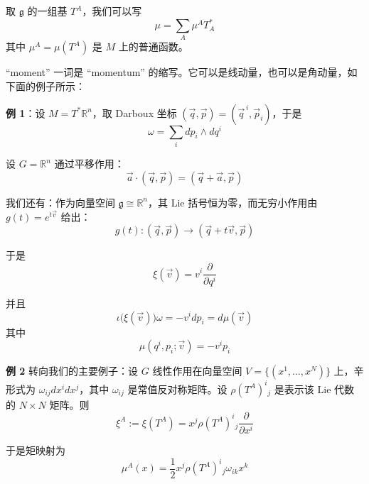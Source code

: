 取 $\mathfrak{g}$ 的一组基 $T^A$，我们可以写
\begin{equation}
  \mu=\sum_A\mu^A T^{*}_A
  \tag{A.12}
  \label{eq:A.12}
\end{equation}
其中 $\mu^A=\mu(T^A)$ 是 $M$ 上的普通函数。

“moment” 一词是 “momentum” 的缩写。它可以是线动量，也可以是角动量，如下面的例子所示：

\textbf{例 1}：设 $M=T^{*}\mathbb{R}^n$，取 Darboux 坐标 $(\vec{q},\vec{p})=(\vec{q}^{\,i},\vec{p}_i)$，于是
\begin{equation}
  \omega=\sum_i dp_i\wedge dq^i
  \tag{A.13}
  \label{eq:A.13}
\end{equation}

设 $G=\mathbb{R}^n$ 通过平移作用：
\begin{equation}
  \vec{a}\cdot(\vec{q},\vec{p})=(\vec{q}+\vec{a},\vec{p})
  \tag{A.14}
  \label{eq:A.14}
\end{equation}

我们还有：作为向量空间 $\mathfrak{g}\cong\mathbb{R}^n$，其 Lie 括号恒为零，而无穷小作用由 $g(t)=e^{t\vec{v}}$ 给出：
\begin{equation}
  g(t):(\vec{q},\vec{p})\to(\vec{q}+t\vec{v},\vec{p})
  \tag{A.15}
  \label{eq:A.15}
\end{equation}

于是
\begin{equation}
  \xi(\vec{v})=v^i\frac{\partial}{\partial q^i}
  \tag{A.16}
  \label{eq:A.16}
\end{equation}

并且
\begin{equation}
  \iota\big(\xi(\vec{v})\big)\omega=-v^idp_i=d\mu(\vec{v})
  \tag{A.17}
  \label{eq:A.17}
\end{equation}
其中
\begin{equation}
  \mu(q^i,p_i;\vec{v})=-v^ip_i
  \tag{A.18}
  \label{eq:A.18}
\end{equation}

\textbf{例 2} 转向我们的主要例子：设 $G$ 线性作用在向量空间 $V=\{(x^1,\dots,x^N)\}$ 上，辛形式为 $\omega_{ij}dx^idx^j$，其中 $\omega_{ij}$ 是常值反对称矩阵。设 $\rho(T^A)^i{}_j$ 是表示该 Lie 代数的 $N\times N$ 矩阵。则
\begin{equation}
  \xi^A:=\xi(T^A)=x^j\rho(T^A)^i{}_j\frac{\partial}{\partial x^i}
  \tag{A.19}
  \label{eq:A.19}
\end{equation}

于是矩映射为
\begin{equation}
  \mu^A(x)=\frac{1}{2}x^j\rho(T^A)^i{}_j\omega_{ik}x^k
  \tag{A.20}
  \label{eq:A.20}
\end{equation}

